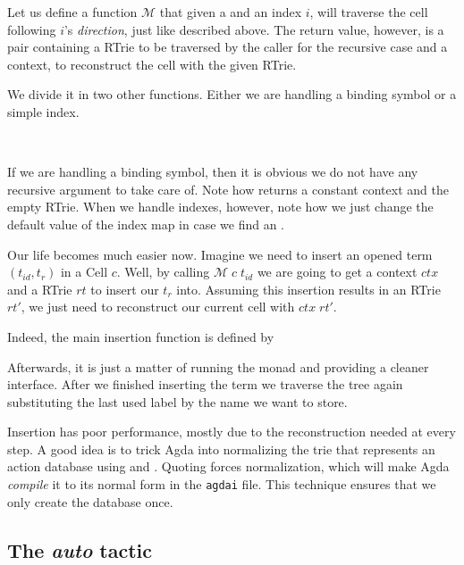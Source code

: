 
Let us define a function $\mathcal{M}$ that given a  and an index $i$,
will traverse the cell following $i$'s \emph{direction}, just like described above. 
The return value, however, is a pair containing a RTrie to be traversed by the caller
for the recursive case and a context, to reconstruct the cell with the given RTrie.


We divide it in two other functions. Either we are handling a binding symbol or a simple index.

\\

If we are handling a binding symbol, then it is obvious we do not have any recursive argument
to take care of. Note how  returns a constant context and the empty RTrie.
When we handle indexes, however, note how we just change the default value of the index map
in case we find an . 

Our life becomes much easier now. Imagine we need to insert an opened term $(t_{id} , t_{r})$
in a Cell $c$. Well, by calling $\mathcal{M}\;c\;t_{id}$ we are going to get a context $ctx$ and
a RTrie $rt$ to insert our $t_{r}$ into. Assuming this insertion results in an RTrie $rt'$,
we just need to reconstruct our current cell with $ctx\;rt'$.

Indeed, the main insertion function is defined by


Afterwards, it is just a matter of running the monad and providing a cleaner interface.
After we finished inserting the term we traverse the tree again substituting the last
used label by the name we want to store.

Insertion has poor performance, mostly due to the reconstruction needed at every step.
A good idea is to trick Agda into normalizing the trie that represents an action database
using  and . Quoting forces normalization, which will make Agda
\emph{compile} it to its normal form in the \texttt{\small agdai} file. This technique
ensures that we only create the database once.

\subsection{The \emph{auto} tactic}

